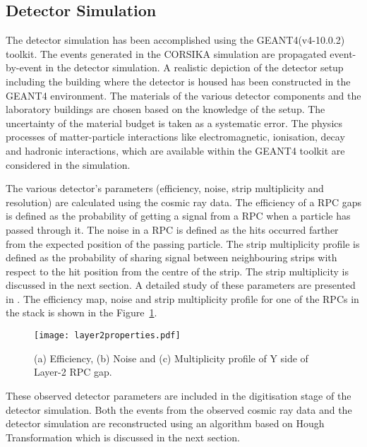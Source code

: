 \subsection{Detector Simulation}
The detector simulation has been accomplished using the
GEANT4(v4-10.0.2) toolkit. The events generated in the CORSIKA
simulation are propagated event-by-event in the detector simulation.
A realistic depiction of the detector setup including the building
where the detector is housed has been constructed in the GEANT4
environment. The materials of the various detector components and
the laboratory buildings are chosen based on the knowledge of the
setup. The uncertainty of the material budget is taken as a systematic
error. The physics processes of matter-particle interactions 
like electromagnetic, ionisation, decay and hadronic interactions,
which are available within the GEANT4 toolkit are considered in the
simulation.

The various detector's parameters (efficiency, noise, strip
multiplicity and resolution) are calculated using the cosmic ray data.
The efficiency of a RPC gaps is defined as the probability of getting
a signal from a RPC when a particle has passed through it. The noise
in a RPC is defined as the hits occurred farther from the expected
position of the passing particle. The strip multiplicity profile is
defined as the probability of sharing signal between neighbouring
strips with respect to the hit position from the centre of the strip.
The strip multiplicity is discussed in the next section.
A detailed study of these parameters are presented in \cite{pethu1}.
The efficiency map, noise and strip multiplicity
profile for one of the RPCs in the stack is shown in the
Figure~\ref{fig:layer2y}.
\begin{figure}[h]
  \centering
  \texttt{[image: layer2properties.pdf]} 
  \caption{(a) Efficiency, (b) Noise and (c) Multiplicity profile of
    Y side of Layer-2 RPC gap.}
  \label{fig:layer2y}
\end{figure}
These observed detector parameters are included in the digitisation
stage of the detector simulation. Both the events from the observed
cosmic ray data and the detector simulation are reconstructed using
an algorithm based on Hough Transformation which is discussed in the
next section.

